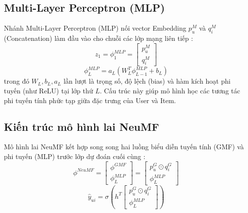 \subsection{Multi-Layer Perceptron (MLP)}
\label{subsec:mlp}

Nhánh Multi-Layer Perceptron (MLP) nối vector Embedding $p_u^M$ và $q_i^M$ (Concatenation) làm đầu vào cho chuỗi các lớp mạng liên tiếp \parencite{he2017ncf}:
\begin{equation}
    z_1 = \phi_1^{MLP} = \begin{bmatrix} p_u^M \\ q_i^M \end{bmatrix}
    \label{eq:mlp_concat}
\end{equation}
\begin{equation}
    \phi_L^{MLP} = a_L \left( W_L^T \phi_{L-1}^{MLP} + b_L \right)
    \label{eq:mlp_layerL}
\end{equation}
trong đó $W_L, b_L, a_L$ lần lượt là trọng số, độ lệch (bias) và hàm kích hoạt phi tuyến (như ReLU) tại lớp thứ $L$. Cấu trúc này giúp mô hình học các tương tác phi tuyến tính phức tạp giữa đặc trưng của User và Item.

\subsection{Kiến trúc mô hình lai NeuMF}
\label{subsec:neumf_arch}

Mô hình lai NeuMF kết hợp song song hai luồng biểu diễn tuyến tính (GMF) và phi tuyến (MLP) trước lớp dự đoán cuối cùng \parencite{he2017ncf}:
\begin{equation}
    \phi^{NeuMF} = \begin{bmatrix} \phi^{GMF} \\ \phi_L^{MLP} \end{bmatrix} = \begin{bmatrix} p_u^G \odot q_i^G \\ \phi_L^{MLP} \end{bmatrix}
    \label{eq:neumf_concat}
\end{equation}
\begin{equation}
    \hat{y}_{ui} = \sigma \left( h^T \begin{bmatrix} p_u^G \odot q_i^G \\ \phi_L^{MLP} \end{bmatrix} \right)
    \label{eq:neumf_prediction}
\end{equation}

